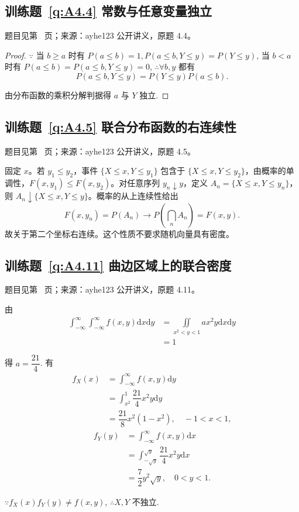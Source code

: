 \subsection*{训练题~\ref{q:A4.4} 常数与任意变量独立}\label{a:A4.4}{\small 题目见第~\pageref{q:A4.4} 页；来源：ayhe123 公开讲义，原题 4.4。}
\begin{proof}
    $\because$ 当 $b\geq a$ 时有 $P(a\leq b)=1,P(a\leq b,Y\leq y)=P(Y\leq y)$, 当 $b<a$ 时有 $P(a\leq b)=P(a\leq b,Y\leq y)=0$, $\therefore\forall b,y$ 都有
    \[P(a\leq b,Y\leq y)=P(Y\leq y)P(a\leq b).\]

    由分布函数的乘积分解判据得 $a$ 与 $Y$ 独立.
\end{proof}

\subsection*{训练题~\ref{q:A4.5} 联合分布函数的右连续性}\label{a:A4.5}{\small 题目见第~\pageref{q:A4.5} 页；来源：ayhe123 公开讲义，原题 4.5。}
\begin{solve}固定 $x$。若 $y_1\le y_2$，事件 $\{X\le x,Y\le y_1\}$ 包含于 $\{X\le x,Y\le y_2\}$，由概率的单调性，$F(x,y_1)\le F(x,y_2)$。对任意序列 $y_n\downarrow y$，定义 $A_n=\{X\le x,Y\le y_n\}$，则 $A_n\downarrow\{X\le x,Y\le y\}$。概率的从上连续性给出\[F(x,y_n)=P(A_n)\longrightarrow P\left(\bigcap_nA_n\right)=F(x,y).\]故关于第二个坐标右连续。这个性质不要求随机向量具有密度。\end{solve}

\subsection*{训练题~\ref{q:A4.11} 曲边区域上的联合密度}\label{a:A4.11}{\small 题目见第~\pageref{q:A4.11} 页；来源：ayhe123 公开讲义，原题 4.11。}
\begin{solve}
    由
    \[\begin{aligned}\int_{-\infty}^\infty\int_{-\infty}^\infty f(x,y)\mathrm{d}x\mathrm{d}y&=\iint\limits_{x^2<y<1}ax^2y\mathrm{d}x\mathrm{d}y\\&=1\end{aligned}\]

    得 $a=\dfrac{21}{4}$. 有
    \[\begin{aligned}f_X(x)&=\int_{-\infty}^\infty f(x,y)\mathrm{d}y\\&=\int_{x^2}^1\dfrac{21}{4}x^2y\mathrm{d}y\\&=\dfrac{21}{8}x^2(1-x^2),\quad -1<x<1,\end{aligned}\]
    \[\begin{aligned}f_Y(y)&=\int_{-\infty}^\infty f(x,y)\mathrm{d}x\\&=\int_{-\sqrt{y}}^{\sqrt{y}}\dfrac{21}{4}x^2y\mathrm{d}x\\&=\dfrac{7}{2}y^2\sqrt{y},\quad 0<y<1.\end{aligned}\]

    $\because f_X(x)f_Y(y)\neq f(x,y)$, $\therefore X,Y$ 不独立.
\end{solve}

